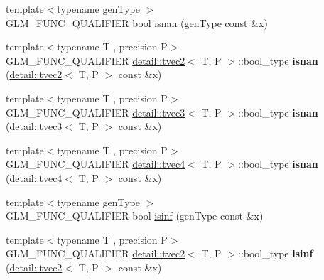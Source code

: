 \begin{DoxyCompactItemize}
\item 
{\footnotesize template$<$typename gen\+Type $>$ }\\G\+L\+M\+\_\+\+F\+U\+N\+C\+\_\+\+Q\+U\+A\+L\+I\+F\+I\+ER bool \hyperlink{group__core__func__common_ga8a9dec5200888766fbcb51b6a5898728}{isnan} (gen\+Type const \&x)
\item 
{\footnotesize template$<$typename T , precision P$>$ }\\G\+L\+M\+\_\+\+F\+U\+N\+C\+\_\+\+Q\+U\+A\+L\+I\+F\+I\+ER \hyperlink{structglm_1_1detail_1_1tvec2}{detail\+::tvec2}$<$ T, P $>$\+::bool\+\_\+type {\bfseries isnan} (\hyperlink{structglm_1_1detail_1_1tvec2}{detail\+::tvec2}$<$ T, P $>$ const \&x)\hypertarget{namespaceglm_a1b217bcbf88c251bc92fdcf38e5beae6}{}\label{namespaceglm_a1b217bcbf88c251bc92fdcf38e5beae6}

\item 
{\footnotesize template$<$typename T , precision P$>$ }\\G\+L\+M\+\_\+\+F\+U\+N\+C\+\_\+\+Q\+U\+A\+L\+I\+F\+I\+ER \hyperlink{structglm_1_1detail_1_1tvec3}{detail\+::tvec3}$<$ T, P $>$\+::bool\+\_\+type {\bfseries isnan} (\hyperlink{structglm_1_1detail_1_1tvec3}{detail\+::tvec3}$<$ T, P $>$ const \&x)\hypertarget{namespaceglm_a57c553ad2d64fe7bd1625d3dddcf65b7}{}\label{namespaceglm_a57c553ad2d64fe7bd1625d3dddcf65b7}

\item 
{\footnotesize template$<$typename T , precision P$>$ }\\G\+L\+M\+\_\+\+F\+U\+N\+C\+\_\+\+Q\+U\+A\+L\+I\+F\+I\+ER \hyperlink{structglm_1_1detail_1_1tvec4}{detail\+::tvec4}$<$ T, P $>$\+::bool\+\_\+type {\bfseries isnan} (\hyperlink{structglm_1_1detail_1_1tvec4}{detail\+::tvec4}$<$ T, P $>$ const \&x)\hypertarget{namespaceglm_aeec38530b971a61c8e7eddbaef854498}{}\label{namespaceglm_aeec38530b971a61c8e7eddbaef854498}

\item 
{\footnotesize template$<$typename gen\+Type $>$ }\\G\+L\+M\+\_\+\+F\+U\+N\+C\+\_\+\+Q\+U\+A\+L\+I\+F\+I\+ER bool \hyperlink{group__core__func__common_ga9fce6a337c7e8ad089b9dc17c70cb873}{isinf} (gen\+Type const \&x)
\item 
{\footnotesize template$<$typename T , precision P$>$ }\\G\+L\+M\+\_\+\+F\+U\+N\+C\+\_\+\+Q\+U\+A\+L\+I\+F\+I\+ER \hyperlink{structglm_1_1detail_1_1tvec2}{detail\+::tvec2}$<$ T, P $>$\+::bool\+\_\+type {\bfseries isinf} (\hyperlink{structglm_1_1detail_1_1tvec2}{detail\+::tvec2}$<$ T, P $>$ const \&x)\hypertarget{namespaceglm_ab39af0e09cb831f24caeddc6268544a8}{}\label{namespaceglm_ab39af0e09cb831f24caeddc6268544a8}


\end{DoxyCompactItemize}
